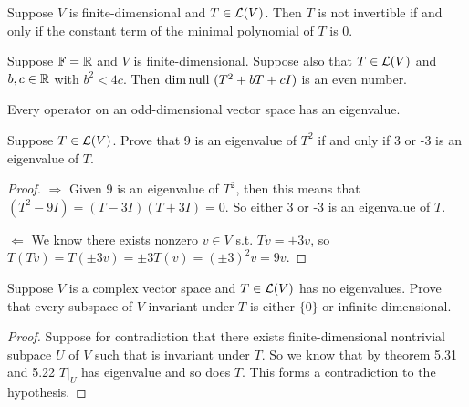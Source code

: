 \documentclass{extarticle}
\begin{document}
\begin{corollary}
    Suppose \(V\) is finite-dimensional and \(T \in \mathcal{L}(V)\). Then \(T\) is not invertible if and only if the 
    constant term of the minimal polynomial of \(T\) is 0.
\end{corollary}

\begin{thm}
    Suppose \(\mathbb{F} = \mathbb{R}\) and \(V\) is finite-dimensional. Suppose also that \(T \in \mathcal{L}(V)\) and 
    \(b, c \in \mathbb{R}\) with \(b^2 < 4c\). Then \(\dim \text{null }(T^2 + bT +cI)\) is an even number.
\end{thm}

\begin{thm}
    Every operator on an odd-dimensional vector space has an eigenvalue. 
\end{thm}



\newpage 
{}


\begin{problem}{1}
    Suppose \(T \in \mathcal{L}(V)\). Prove that 9 is an eigenvalue of \(T^2\) if and only if 3 or -3 is an eigenvalue 
    of \(T\). 
\end{problem}

\begin{proof}
\(\Rightarrow\) Given 9 is an eigenvalue of \(T^2\), then this means that \((T^2 - 9I) = (T - 3I)(T+3I) = 0\). 
So either 3 or -3 is an eigenvalue of \(T\). 

\(\Leftarrow\) We know there exists nonzero \(v \in V\) s.t. \(Tv = \pm 3v\), so \(T(Tv) = T( \pm 3v) 
= \pm 3 T(v) = (\pm 3)^2 v = 9v\).

\end{proof}

\begin{problem}{2}
    Suppose \(V\) is a complex vector space and \(T \in \mathcal{L}(V)\) has no eigenvalues. Prove that every subspace 
    of \(V\) invariant under \(T\) is either \(\{0\}\) or infinite-dimensional. 
\end{problem}

\begin{proof}
Suppose for contradiction that there exists finite-dimensional nontrivial subpace \(U\) of \(V\) such that is invariant 
under \(T\). So we know that by theorem 5.31 and 5.22 \(T|_U\) has eigenvalue and so does \(T\). This forms a contradiction 
to the hypothesis.
\end{proof}
\end{document}
